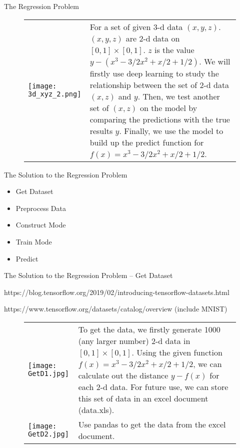 \documentclass{beamer}
\begin{document}
\begin{frame}{The Regression Problem}

\begin{figure}
  \begin{tabular}{p{} p{}}
\vspace{10pt} \texttt{[image: 3d\_xyz\_2.png]}
&\vspace{-10pt} \small{For a set of given 3-d data $(x,y,z)$. $(x,y,z)$ are 2-d data on $[0,1]\times[0,1]$. $z$ is the value $y-(x^3-3/2 x^2+x/2+1/2)$. We will firstly use deep learning to study the relationship between the set of 2-d data $(x,z)$ and $y$. Then, we test another set of $(x,z)$ on the model by comparing the predictions with the true results $y$. Finally, we use the model to build up the predict function for $f(x)=x^3-3/2 x^2+x/2+1/2$.}
     \end{tabular}
\end{figure}

\end{frame}



\begin{frame}{The Solution to the Regression Problem}

\begin{itemize}
  \item Get Dataset
  \item Preprocess Data
  \item Construct Mode
  \item Train Mode
  \item Predict
\end{itemize}

\end{frame}


\begin{frame}{The Solution to the Regression Problem -- Get Dataset}

https://blog.tensorflow.org/2019/02/introducing-tensorflow-datasets.html

https://www.tensorflow.org/datasets/catalog/overview (include MNIST)

\begin{figure}
  \begin{tabular}{p{} p{}}
\vspace{-10pt} \texttt{[image: GetD1.jpg]}
&\vspace{-5pt} \small{To get the data, we firstly generate 1000 (any larger number) 2-d data in $[0,1]\times[0,1]$. Using the given function $f(x)=x^3-3/2 x^2+x/2+1/2$, we can calculate out the distance $y-f(x)$ for each 2-d data. For future use, we can store this set of data in an excel document (data.xls).}\\
\vspace{-7pt} \texttt{[image: GetD2.jpg]}
&\vspace{-5pt} \small{Use pandas to get the data from the excel document.}
\end{tabular}
\end{figure}
\end{frame}
\end{document}
